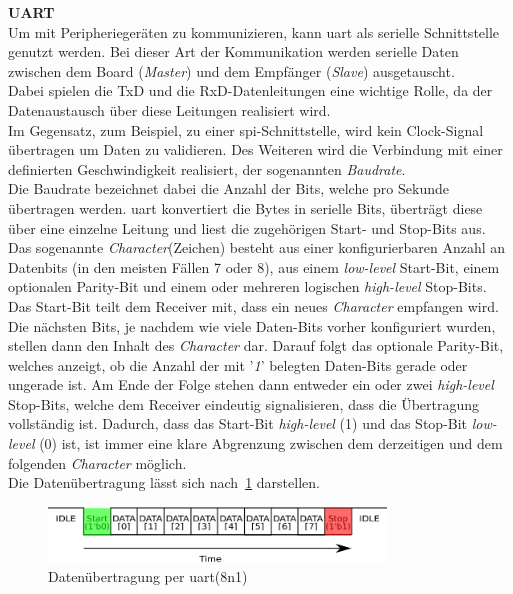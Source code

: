 \textbf{UART}\\
Um mit Peripheriegeräten zu kommunizieren, kann \ac{uart} als serielle Schnittstelle genutzt werden.
Bei dieser Art der Kommunikation werden serielle Daten zwischen dem Board (\emph{Master})
und dem Empfänger (\emph{Slave}) ausgetauscht. \\
Dabei spielen die TxD und die RxD-Datenleitungen
eine wichtige Rolle, da der Datenaustausch über diese Leitungen realisiert wird.\\
Im Gegensatz, zum Beispiel, zu einer \ac{spi}-Schnittstelle, wird kein Clock-Signal
übertragen um Daten zu validieren. Des Weiteren wird die Verbindung mit einer definierten
Geschwindigkeit realisiert, der sogenannten \emph{Baudrate}.~\cite{uartpdf} \\
Die Baudrate bezeichnet dabei die Anzahl der Bits, welche pro Sekunde übertragen werden.
\ac{uart} konvertiert die Bytes in serielle Bits, überträgt diese über eine einzelne Leitung
und liest die zugehörigen Start- und Stop-Bits aus.\\
Das sogenannte \emph{Character}(Zeichen) besteht aus einer konfigurierbaren Anzahl an Datenbits (in den meisten
Fällen 7 oder 8), aus einem \emph{low-level} Start-Bit, einem optionalen Parity-Bit und einem
oder mehreren logischen \emph{high-level} Stop-Bits.\\
Das Start-Bit teilt dem Receiver mit, dass ein neues \emph{Character} empfangen wird.
Die nächsten Bits, je nachdem wie viele Daten-Bits vorher konfiguriert wurden, stellen
dann den Inhalt des \emph{Character} dar. Darauf folgt das optionale Parity-Bit,
welches anzeigt, ob die Anzahl der mit '\emph{1}' belegten Daten-Bits gerade oder
ungerade ist. Am Ende der Folge stehen dann entweder ein oder zwei  \emph{high-level } Stop-Bits,
welche dem Receiver eindeutig signalisieren, dass die Übertragung vollständig ist. Dadurch,
dass das Start-Bit \emph{high-level} (1) und das Stop-Bit \emph{low-level} (0) ist,
ist immer eine klare Abgrenzung zwischen dem derzeitigen und dem folgenden \emph{Character} möglich.\\

Die Datenübertragung lässt sich nach~\ref{fig:uart} darstellen.\\

\begin{figure}[h!]
\centering
\includegraphics[width=0.8\textwidth]{Hauptteil/uart.eps}
\caption{Datenübertragung per \ac{uart}(8n1) }
\label{fig:uart}
\end{figure}

